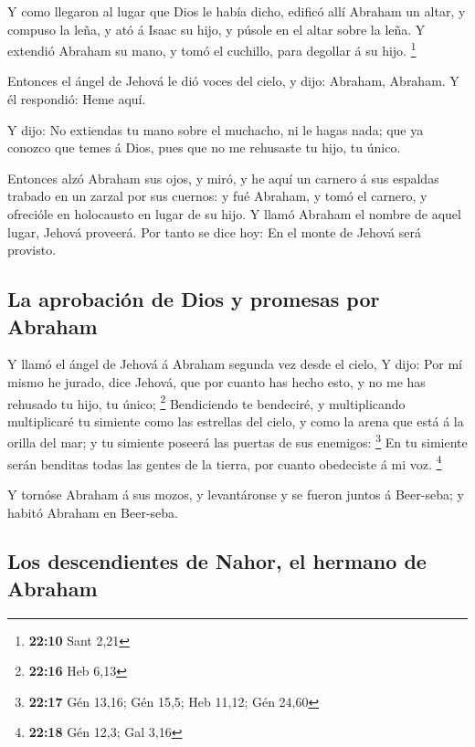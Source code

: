  Y como llegaron al lugar que Dios le había dicho, edificó
allí Abraham un altar, y compuso la leña, y ató á Isaac su hijo, y
púsole en el altar sobre la leña.  Y extendió Abraham su
mano, y tomó el cuchillo, para degollar á su hijo. \footnote{\textbf{22:10}
  Sant 2,21}

 Entonces el ángel de Jehová le dió voces del cielo, y
dijo: Abraham, Abraham. Y él respondió: Heme aquí.

 Y dijo: No extiendas tu mano sobre el muchacho, ni le
hagas nada; que ya conozco que temes á Dios, pues que no me rehusaste tu
hijo, tu único.

 Entonces alzó Abraham sus ojos, y miró, y he aquí un
carnero á sus espaldas trabado en un zarzal por sus cuernos: y fué
Abraham, y tomó el carnero, y ofrecióle en holocausto en lugar de su
hijo.  Y llamó Abraham el nombre de aquel lugar, Jehová
proveerá. Por tanto se dice hoy: En el monte de Jehová será provisto.

\hypertarget{la-aprobaciuxf3n-de-dios-y-promesas-por-abraham}{%
\subsection{La aprobación de Dios y promesas por
Abraham}\label{la-aprobaciuxf3n-de-dios-y-promesas-por-abraham}}

 Y llamó el ángel de Jehová á Abraham segunda vez desde el
cielo,  Y dijo: Por mí mismo he jurado, dice Jehová, que
por cuanto has hecho esto, y no me has rehusado tu hijo, tu único;
\footnote{\textbf{22:16} Heb 6,13}  Bendiciendo te
bendeciré, y multiplicando multiplicaré tu simiente como las estrellas
del cielo, y como la arena que está á la orilla del mar; y tu simiente
poseerá las puertas de sus enemigos: \footnote{\textbf{22:17} Gén 13,16;
  Gén 15,5; Heb 11,12; Gén 24,60}  En tu simiente serán
benditas todas las gentes de la tierra, por cuanto obedeciste á mi voz.
\footnote{\textbf{22:18} Gén 12,3; Gal 3,16}

 Y tornóse Abraham á sus mozos, y levantáronse y se fueron
juntos á Beer-seba; y habitó Abraham en Beer-seba.

\hypertarget{los-descendientes-de-nahor-el-hermano-de-abraham}{%
\subsection{Los descendientes de Nahor, el hermano de
Abraham}\label{los-descendientes-de-nahor-el-hermano-de-abraham}}

